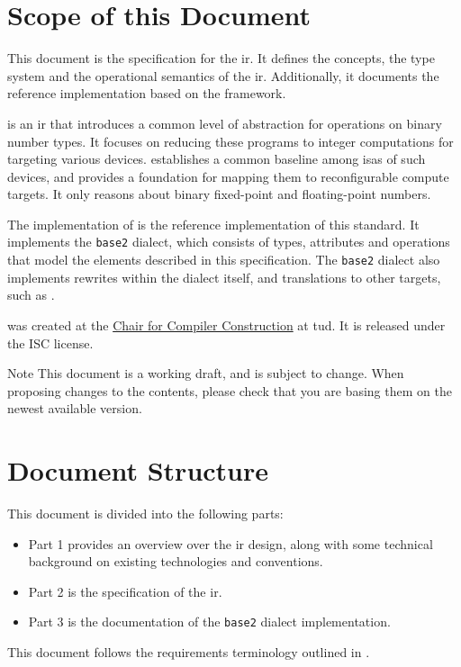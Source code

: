 \section{Scope of this Document}

This document is the specification for the \basetwo \gls{ir}.
It defines the concepts, the type system and the operational semantics of the \basetwo \gls{ir}.
Additionally, it documents the \basetwo reference implementation based on the \MLIR framework.

\basetwo is an \gls{ir} that introduces a common level of abstraction for operations on binary number types.
It focuses on reducing these programs to integer computations for targeting various devices.
\basetwo establishes a common baseline among \glspl{isa} of such devices, and provides a foundation for mapping them to reconfigurable compute targets.
It only reasons about binary fixed-point and floating-point numbers.

The \MLIR implementation of \basetwo is the reference implementation of this standard.
It implements the \texttt{base2} dialect, which consists of types, attributes and operations that model the elements described in this specification.
The \texttt{base2} dialect also implements rewrites within the dialect itself, and translations to other targets, such as \LLVMIR.

\basetwo was created at the \href{https://cfaed.tu-dresden.de/ccc-about}{Chair for Compiler Construction} at \gls{tud}.
It is released under the ISC license.

\begin{remark}{Note}
    This document is a working draft, and is subject to change.
    When proposing changes to the contents, please check that you are basing them on the newest available version.
\end{remark}

\section{Document Structure}

This document is divided into the following parts:
\begin{itemize}
    \item Part 1 provides an overview over the \basetwo \gls{ir} design, along with some technical background on existing technologies and conventions.
    \item Part 2 is the specification of the \basetwo \gls{ir}.
    \item Part 3 is the documentation of the \texttt{base2} dialect implementation.
\end{itemize}

\glsaddall



This document follows the requirements terminology outlined in \cite{RFC_2119}.

